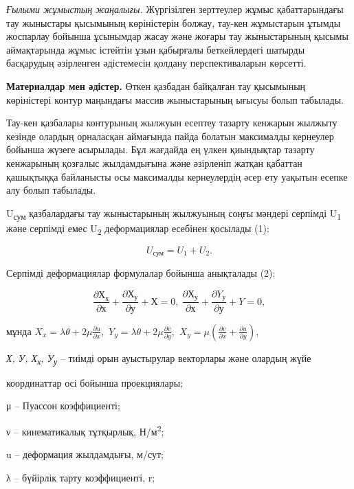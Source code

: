 \begin{multicols}{2}
\emph{Ғылыми жұмыстың жаңалығы.} Жүргізілген зерттеулер жұмыс
қабаттарындағы тау жыныстары қысымының көріністерін болжау, тау-кен
жұмыстарын ұтымды жоспарлау бойынша ұсынымдар жасау және жоғары тау
жыныстарының қысымы аймақтарында жұмыс істейтін ұзын қабырғалы
беткейлердегі шатырды басқарудың әзірленген әдістемесін қолдану
перспективаларын көрсетті.

{\bfseries Материалдар мен әдістер.} Өткен қазбадан байқалған тау қысымының
көріністері контур маңындағы массив жыныстарының ығысуы болып табылады.

Тау-кен қазбалары контурының жылжуын есептеу тазарту кенжарын жылжыту
кезінде олардың орналасқан аймағында пайда болатын максималды кернеулер
бойынша жүзеге асырылады. Бұл жағдайда ең үлкен қиындықтар тазарту
кенжарының қозғалыс жылдамдығына және әзірленіп жатқан қабаттан
қашықтыққа байланысты осы максималды кернеулердің әсер ету уақытын
есепке алу болып табылады.

U\textsubscript{сум} қазбалардағы тау жыныстарының жылжуының соңғы
мәндері серпімді U\textsubscript{1} және серпімді емес
U\textsubscript{2} деформациялар есебінен қосылады (1):

\begin{equation}
U_{сум} = U_{1} + U_{2}.
\end{equation}

Серпімді деформациялар формулалар бойынша анықталады (2):

\begin{equation}
\frac{\partial Х_{х}}{\partial х} + \frac{\partial Х_{у}}{\partial у} + Х = 0,\ \frac{\partial Х_{у}}{\partial х} + \frac{\partial Y_{у}}{\partial у} + Y = 0,
\end{equation}

мұнда \(X_{x} = \lambda\theta + 2\mu\frac{\partial u}{\partial x},\)
\(Y_{y} = \lambda\theta + 2\mu\frac{\partial v}{\partial y},\)
\(X_{y} = \mu\left( \frac{\partial v}{\partial x} + \frac{\partial u}{\partial y} \right),\)

\emph{Х, У, Х\textsubscript{х}, У\textsubscript{у}} -- тиімді орын
ауыстырулар векторлары және олардың жүйе

координаттар осі бойынша проекциялары;

μ -- Пуассон коэффициенті;

ν -- кинематикалық тұтқырлық, Н/м\textsuperscript{2};

u -- деформация жылдамдығы, м/сут;

λ -- бүйірлік тарту коэффициенті, r;


\end{multicols}
